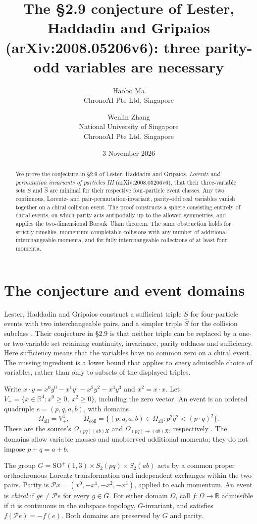\documentclass[11pt,a4paper]{article}
\title{The \S2.9 conjecture of Lester, Haddadin and Gripaios\break
(arXiv:2008.05206v6):\break
three parity-odd variables are necessary}
\author{Haobo Ma\\\small ChronoAI Pte Ltd, Singapore
\and Wenlin Zhang\\\small National University of Singapore\\
\small ChronoAI Pte Ltd, Singapore}
\date{3 November 2026}
\newcommand{\RR}{\mathbb R}
\newcommand{\SO}{\mathrm{SO}^{+}(1,3)}
\newcommand{\PP}{\mathcal P}
\newcommand{\all}{\Omega_{\mathrm{all}}}
\newcommand{\coll}{\Omega_{\mathrm{coll}}}
\begin{document}
\maketitle
\begin{abstract}
We prove the conjecture in \S2.9 of Lester, Haddadin and Gripaios,
\emph{Lorentz and permutation invariants of particles III}
(arXiv:2008.05206v6), that their three-variable sets $S$ and $\hat S$
are minimal for their respective four-particle event classes.
Any two continuous, Lorentz- and pair-permutation-invariant, parity-odd
real variables vanish together on a chiral collision event.
The proof constructs a sphere consisting entirely of chiral events,
on which parity acts antipodally up to the allowed symmetries, and
applies the two-dimensional Borsuk--Ulam theorem.
The same obstruction holds for strictly timelike, momentum-completable
collisions with any number of additional interchangeable momenta,
and for fully interchangeable collections of at least four momenta.
\end{abstract}

\section{The conjecture and event domains}

Lester, Haddadin and Gripaios construct a sufficient triple $S$ for
four-particle events with two interchangeable pairs, and a simpler
triple $\hat S$ for the collision subclass \cite[\S5.1]{LHG}.
Their conjecture in \S2.9 is that neither triple can be replaced by a
one- or two-variable set retaining continuity, invariance, parity oddness
and sufficiency. Here sufficiency means that the variables have no
common zero on a chiral event. The missing ingredient is a lower bound
that applies to \emph{every} admissible choice of variables, rather
than only to subsets of the displayed triples.

Write $x\cdot y=x^0y^0-x^1y^1-x^2y^2-x^3y^3$ and $x^2=x\cdot x$.
Let $V_+=\{x\in\RR^4:x^0\geq0,\ x^2\geq0\}$, including the zero
vector. An event is an ordered quadruple $e=(p,q,a,b)$, with domains
\[
 \all=V_+^4,\qquad
 \coll=\{(p,q,a,b)\in\all:p^2q^2<(p\cdot q)^2\}.
\]
These are the source's $\Omega_{(pq)(ab)X}$ and
$\Omega_{(pq)\rightarrow(ab)X}$, respectively
\cite[\S3, definition of collision events and final two domain definitions]{LHG}.
The domains allow variable masses and unobserved additional momenta;
they do not impose $p+q=a+b$.

The group $G=\SO\times S_2(pq)\times S_2(ab)$ acts by a common
proper orthochronous Lorentz transformation and independent exchanges
within the two pairs. Parity is $\PP x=(x^0,-x^1,-x^2,-x^3)$,
applied to each momentum. An event is \emph{chiral} if $g e\ne\PP e$
for every $g\in G$.
For either domain $\Omega$, call $f:\Omega\to\RR$ admissible if it
is continuous in the subspace topology, $G$-invariant, and satisfies
$f(\PP e)=-f(e)$. Both domains are preserved by $G$ and parity.
\end{document}
